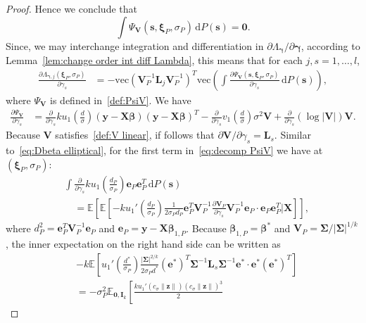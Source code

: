 \documentclass{article}
\numberwithin{equation}{section}
\theoremstyle{plain}
\newcommand{\dd}{\mathrm{d}}
\newcommand{\vc}{\mathrm{vec}}
\newcommand{\bbeta}{\bm\beta}
\newcommand{\bxi}{\bm\xi}
\newcommand{\bgamma}{\bm\gamma}
\newcommand{\bSigma}{\mathbf{\Sigma}}
\newcommand{\by}{\mathbf{y}}
\newcommand{\bs}{\mathbf{s}}
\newcommand{\bz}{\mathbf{z}}
\newcommand{\be}{\mathbf{e}}
\newcommand{\bX}{\mathbf{X}}
\newcommand{\bV}{\mathbf{V}}
\newcommand{\bI}{\mathbf{I}}
\newcommand{\bL}{\mathbf{L}}
\newcommand{\E}{\mathbb{E}}
\begin{document}
\begin{proof}
Hence we conclude that 
\[
\int \Psi_{\bV}(\bs,\bxi_P,\sigma_P)\,\text{d}P(\bs)=\mathbf{0}.
\]
Since, we may interchange integration and differentiation in $\partial\Lambda_{\bgamma}/\partial\bgamma$,
according to Lemma~\ref{lem:change order int diff Lambda},
this means that
for each $j,s=1,\ldots,l$,
\begin{equation}
\label{eq:Dlambda-gamma}
\begin{split}
\frac{\partial\Lambda_{\bgamma,j}(\bxi_P,\sigma_P)}{\partial \gamma_s}
&=
-
\vc\left(\bV_P^{-1}\bL_j\bV_P^{-1}\right)^T\vc\left(
\int
\frac{\partial\Psi_{\bV}(\bs,\bxi_P,\sigma_P)}{\partial \gamma_s}
\,\dd P(\bs)
\right),
\end{split}
\end{equation}
where $\Psi_\bV$ is defined in~\eqref{def:PsiV}.
We have
\begin{equation}
\label{eq:decomp PsiV}
\begin{split}
\frac{\partial \Psi_\bV}{\partial\gamma_s}
&=
\frac{\partial}{\partial\gamma_s}
k
u_1\left(\frac{d}{\sigma}\right)
(\by-\bX\bbeta)(\by-\bX\bbeta)^T
-
\frac{\partial}{\partial\gamma_s}
v_1\left(\frac{d}{\sigma}\right)\sigma^2\mathbf{V}
+
\frac{\partial}{\partial\gamma_s}
(\log|\bV|)\mathbf{V}.
\end{split}
\end{equation}
Because $\bV$ satisfies~\eqref{def:V linear}, if follows that $\partial\bV/\partial\gamma_s=\bL_s$.
Similar to~\eqref{eq:Dbeta elliptical}, for the first term in~\eqref{eq:decomp PsiV} we have at~$(\bxi_P,\sigma_P)$:
\[
\begin{split}
&\int
\frac{\partial}{\partial\gamma_s}
k
u_1\left(\frac{d_P}{\sigma_P}\right)
\be_P\be_P^T
\,\text{d}P(\bs)\\
&\quad=
\E
\left[
\E
\left[
-k
u_1'\left(\frac{d_P}{\sigma_P}\right)
\frac{1}{2\sigma_P d_P}
\be_P^T\bV_P^{-1}\frac{\partial\bV_P}{\partial\gamma_s}\bV_P^{-1}\be_P
\cdot
\be_P\be_P^T
\bigg|
\bX
\right]
\right],
\end{split}
\]
where $d_P^2=\be_P^T\bV_P^{-1}\be_P$ and $\be_P=\by-\bX\bbeta_{1,P}$.
Because $\bbeta_{1,P}=\bbeta^*$ and $\bV_P=\bSigma/|\bSigma|^{1/k}$, 
the inner expectation on the right hand side can be written as
\[
\begin{split}
&
-k
\E
\left[
u_1'\left(\frac{d^*}{\sigma_P}\right)
\frac{|\bSigma|^{2/k}}{2\sigma_Pd^*}
(\be^*)^T\bSigma^{-1}\bL_s\bSigma^{-1}\be^*
\cdot
\be^*(\be^*)^T
\right]\\
&=
-
\sigma_P^2
\E_{\mathbf{0},\bI_k}
\left[
\frac{ku_1'\left(c_\sigma\|\bz\|\right)(c_\sigma\|\bz\|)^3}2

\end{split}\]
\end{proof}
\end{document}
